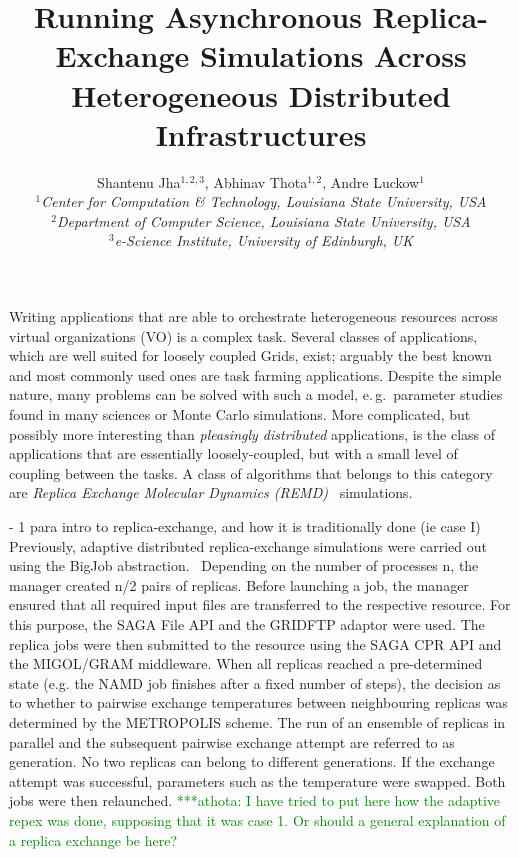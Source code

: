 \documentclass[a4paper,10pt]{article}
\newcommand{\athotanote}[1]{ {\textcolor{green} { ***athota: #1 }}}
\begin{document}
\title{\LARGE Running Asynchronous Replica-Exchange Simulations Across Heterogeneous Distributed Infrastructures}
 
\author{Shantenu Jha$^{1,2,3}$, Abhinav Thota$^{1,2}$, Andre Luckow$^{1}$ \\
   \small{\emph{$^{1}$Center for Computation \& Technology, Louisiana State University, USA}}\\
   \small{\emph{$^{2}$Department of Computer Science, Louisiana State University, USA}}\\
   \small{\emph{$^{3}$e-Science Institute, University of Edinburgh, UK}}
   }
 
\maketitle
 
Writing applications that are able to orchestrate heterogeneous
resources across virtual organizations (VO) is a complex task.  Several 
classes of applications, which are well suited for loosely
coupled Grids, exist; arguably the best known and most commonly used ones are
task farming applications. Despite the simple nature, many problems
can be solved with such a model, e.\,g.\ parameter studies found in
many sciences or Monte Carlo simulations. More complicated, but possibly more 
interesting than {\it pleasingly  distributed} applications, is the class of applications that are
essentially loosely-coupled, but with a small level of coupling
between the tasks.  A class of algorithms that belongs to this category are
\emph{Replica Exchange Molecular Dynamics (REMD)}~\cite{hansmann,Sugita:1999rm} simulations. 
 
 
- 1 para intro to replica-exchange, and how it is traditionally done (ie case I)
Previously, adaptive distributed replica-exchange simulations were carried out using the BigJob abstraction.~\cite{Luckow et al. 2009}
 Depending on the number of processes n, the manager created n/2 pairs of replicas. Before launching a job, the manager
 ensured that all required input files are transferred to the respective
resource. For this purpose, the SAGA File API and the GRIDFTP adaptor were
used. The replica jobs were then submitted to the resource using the SAGA CPR
API and the MIGOL/GRAM middleware.
When all replicas reached a pre-determined state (e.g. the NAMD job finishes
after a fixed number of steps), the decision as to whether to pairwise exchange
temperatures between neighbouring replicas was determined by the METROPOLIS
scheme. The run of an ensemble of replicas in parallel and the subsequent
pairwise exchange attempt are referred to as generation. No two replicas can
belong to different generations. If the exchange attempt was successful, parameters
such as the temperature were swapped. Both jobs were then relaunched. 
 \athotanote{I have tried to put here how the adaptive repex was done, supposing that it was case 1. Or should a general
  explanation of a replica exchange be here?}
 
\end{document}
